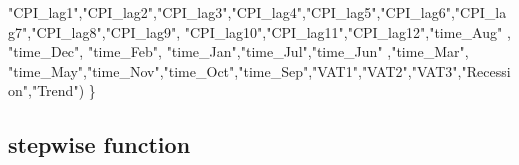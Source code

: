 \documentclass[
]{article}
\newenvironment{Shaded}{\begin{snugshade}}{\end{snugshade}}
\newcommand{\NormalTok}[1]{#1}
\newcommand{\StringTok}[1]{\textcolor[rgb]{0.31,0.60,0.02}{#1}}
\begin{document}
\begin{Shaded}
\begin{Highlighting}[]
                                         \StringTok{"CPI\_lag1"}\NormalTok{,}\StringTok{"CPI\_lag2"}\NormalTok{,}\StringTok{"CPI\_lag3"}\NormalTok{,}\StringTok{"CPI\_lag4"}\NormalTok{,}\StringTok{"CPI\_lag5"}\NormalTok{,}\StringTok{"CPI\_lag6"}\NormalTok{,}\StringTok{"CPI\_lag7"}\NormalTok{,}\StringTok{"CPI\_lag8"}\NormalTok{,}\StringTok{"CPI\_lag9"}\NormalTok{,}
                                         \StringTok{"CPI\_lag10"}\NormalTok{,}\StringTok{"CPI\_lag11"}\NormalTok{,}\StringTok{"CPI\_lag12"}\NormalTok{,}\StringTok{"time\_Aug"}\NormalTok{ , }
                                         \StringTok{"time\_Dec"}\NormalTok{, }\StringTok{"time\_Feb"}\NormalTok{, }\StringTok{"time\_Jan"}\NormalTok{,}\StringTok{"time\_Jul"}\NormalTok{,}\StringTok{"time\_Jun"}\NormalTok{ ,}\StringTok{"time\_Mar"}\NormalTok{,}
                                         \StringTok{"time\_May"}\NormalTok{,}\StringTok{"time\_Nov"}\NormalTok{,}\StringTok{"time\_Oct"}\NormalTok{,}\StringTok{"time\_Sep"}\NormalTok{,}\StringTok{"VAT1"}\NormalTok{,}\StringTok{"VAT2"}\NormalTok{,}\StringTok{"VAT3"}\NormalTok{,}\StringTok{"Recession"}\NormalTok{,}\StringTok{"Trend"}\NormalTok{)}
\NormalTok{\}}
\end{Highlighting}
\end{Shaded}

\hypertarget{stepwise-function}{%
\subsection{stepwise function}\label{stepwise-function}}
\end{document}

